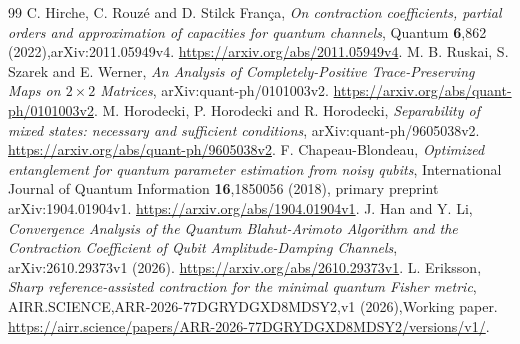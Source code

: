 \documentclass[11pt]{article}
\theoremstyle{remark}
\begin{document}
\begin{thebibliography}{99}
C. Hirche, C. Rouz\'e and D. Stilck Fran\c{c}a,
\emph{On contraction coefficients, partial orders and approximation of capacities for quantum channels},
Quantum \textbf{6},862 (2022),arXiv:2011.05949v4.
\url{https://arxiv.org/abs/2011.05949v4}.
M. B. Ruskai, S. Szarek and E. Werner,
\emph{An Analysis of Completely-Positive Trace-Preserving Maps on $2\times2$ Matrices},
arXiv:quant-ph/0101003v2. \url{https://arxiv.org/abs/quant-ph/0101003v2}.
M. Horodecki, P. Horodecki and R. Horodecki,
\emph{Separability of mixed states: necessary and sufficient conditions},
arXiv:quant-ph/9605038v2. \url{https://arxiv.org/abs/quant-ph/9605038v2}.
F. Chapeau-Blondeau,
\emph{Optimized entanglement for quantum parameter estimation from noisy qubits},
International Journal of Quantum Information \textbf{16},1850056 (2018),
primary preprint arXiv:1904.01904v1.
\url{https://arxiv.org/abs/1904.01904v1}.
J. Han and Y. Li,
\emph{Convergence Analysis of the Quantum Blahut-Arimoto Algorithm and the Contraction Coefficient of Qubit Amplitude-Damping Channels},
arXiv:2610.29373v1 (2026). \url{https://arxiv.org/abs/2610.29373v1}.
L. Eriksson,
\emph{Sharp reference-assisted contraction for the minimal quantum Fisher metric},
AIRR.SCIENCE,ARR-2026-77DGRYDGXD8MDSY2,v1 (2026),Working paper.
\url{https://airr.science/papers/ARR-2026-77DGRYDGXD8MDSY2/versions/v1/}.
\end{thebibliography}
\end{document}
